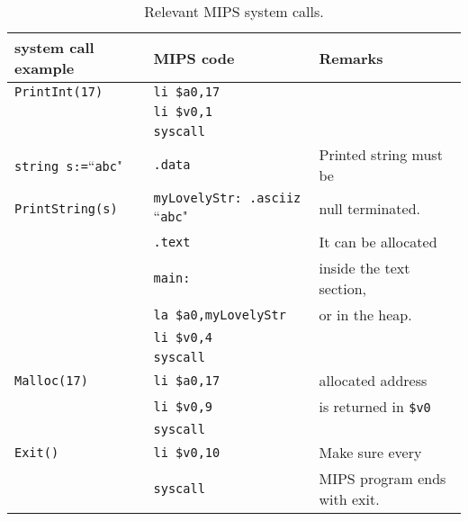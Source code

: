 \documentclass{article}
\begin{document}
\begin{table}[h]
\centering
\begin{tabular}{|l|l|l|}
\hline
system call example & MIPS code & Remarks      \\
\hline
\verb"PrintInt(17)" & \verb"li $a0,17" & \\
                    & \verb"li $v0,1"  & \\
                    & \verb"syscall"   & \\
\hline
\verb"string s:="``\verb"abc"" & \verb".data"                              & Printed string must be   \\
\verb"PrintString(s)"          & \verb"myLovelyStr: .asciiz "``\verb"abc"" & null terminated.         \\
                               & \verb".text"                              & It can be allocated      \\
                               & \verb"main:"                              & inside the text section, \\
                               & \verb"la $a0,myLovelyStr"                 & or in the heap.          \\
                               & \verb"li $v0,4"                           &                          \\
                               & \verb"syscall"                            &                          \\
\hline
\verb"Malloc(17)" & \verb"li $a0,17" & allocated address         \\
                  & \verb"li $v0,9"  & is returned in \verb"$v0" \\
                  & \verb"syscall"   &                           \\
\hline
\verb"Exit()"    & \verb"li $v0,10" & Make sure every              \\
                 & \verb"syscall"   & MIPS program ends with exit. \\
\hline
\end{tabular}
\caption{Relevant MIPS system calls.
\label{Table_MIPS_System_Calls}}
\end{table}
\end{document}

